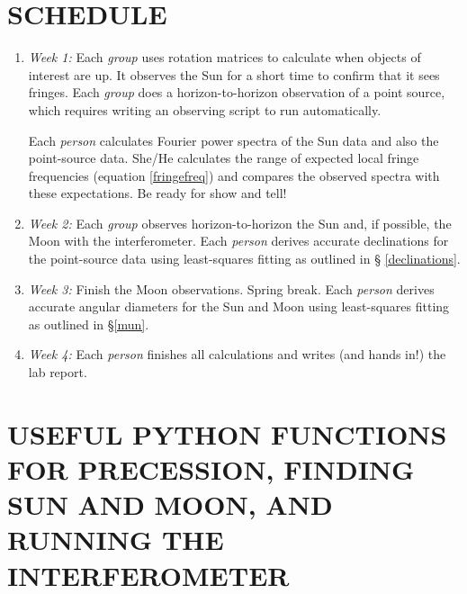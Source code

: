 \documentclass[11pt,preprint]{aastex}
\begin{document}
\section{SCHEDULE}

\begin{enumerate}

\item {\it Week 1:} Each {\it group} uses rotation
  matrices to calculate when objects of interest are up. It observes the
  Sun for a short time to confirm that it sees fringes. Each {\it group}
  does a horizon-to-horizon observation of a point source, which
  requires writing an observing script to run automatically.

Each {\it person} calculates Fourier power spectra of the Sun data and
also the point-source data. She/He calculates the range of expected
local fringe frequencies (equation \ref{fringefreq}) and compares the
observed spectra with these expectations. Be ready for show and tell!

\item {\it Week 2:} Each {\it group} observes
  horizon-to-horizon the Sun and, if possible, the Moon with the
  interferometer.  Each {\it person} derives accurate declinations for
  the point-source data using least-squares fitting as outlined in \S
  \ref{declinations}.

\item {\it Week 3:} Finish the Moon observations. Spring
  break. Each {\it person} derives accurate angular diameters for the
  Sun and Moon using least-squares fitting as outlined in \S \ref{mun}.

\item {\it Week 4:} Each {\it person} finishes all
  calculations and writes (and hands in!) the lab report.

\end{enumerate}

\section{USEFUL PYTHON FUNCTIONS FOR PRECESSION, FINDING SUN AND MOON, AND
RUNNING THE INTERFEROMETER}
\end{document}
